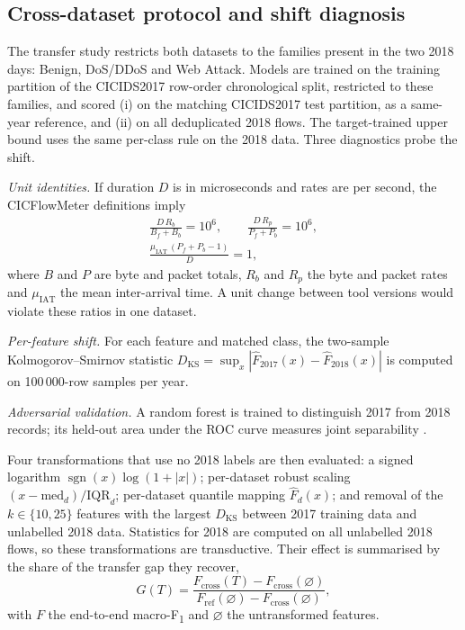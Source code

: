 \documentclass[conference]{IEEEtran}
\newcommand{\Fone}{F\textsubscript{1}}
\begin{document}
\subsection{Cross-dataset protocol and shift diagnosis}
The transfer study restricts both datasets to the families present in the two 2018 days: Benign, DoS/DDoS and Web Attack. Models are trained on the training partition of the CICIDS2017 row-order chronological split, restricted to these families, and scored (i) on the matching CICIDS2017 test partition, as a same-year reference, and (ii) on all deduplicated 2018 flows. The target-trained upper bound uses the same per-class rule on the 2018 data. Three diagnostics probe the shift.

\textit{Unit identities.} If duration $D$ is in microseconds and rates are per second, the CICFlowMeter definitions imply
\begin{equation}
\label{eq:units}
\begin{gathered}
\frac{D\,R_b}{B_f+B_b}=10^6,\qquad \frac{D\,R_p}{P_f+P_b}=10^6,\\
\frac{\mu_{\mathrm{IAT}}\,(P_f+P_b-1)}{D}=1,
\end{gathered}
\end{equation}
where $B$ and $P$ are byte and packet totals, $R_b$ and $R_p$ the byte and packet rates and $\mu_{\mathrm{IAT}}$ the mean inter-arrival time. A unit change between tool versions would violate these ratios in one dataset.

\textit{Per-feature shift.} For each feature and matched class, the two-sample Kolmogorov--Smirnov statistic $D_{\mathrm{KS}}=\sup_x|\hat F_{2017}(x)-\hat F_{2018}(x)|$ is computed on 100\,000-row samples per year.

\textit{Adversarial validation.} A random forest is trained to distinguish 2017 from 2018 records; its held-out area under the ROC curve measures joint separability \cite{quionero2009}.

Four transformations that use no 2018 labels are then evaluated: a signed logarithm $\operatorname{sgn}(x)\log(1+|x|)$; per-dataset robust scaling $(x-\mathrm{med}_d)/\mathrm{IQR}_d$; per-dataset quantile mapping $\hat F_d(x)$; and removal of the $k\in\{10,25\}$ features with the largest $D_{\mathrm{KS}}$ between 2017 training data and unlabelled 2018 data. Statistics for 2018 are computed on all unlabelled 2018 flows, so these transformations are transductive. Their effect is summarised by the share of the transfer gap they recover,
\begin{equation}
G(T)=\frac{F_{\mathrm{cross}}(T)-F_{\mathrm{cross}}(\varnothing)}{F_{\mathrm{ref}}(\varnothing)-F_{\mathrm{cross}}(\varnothing)},
\end{equation}
with $F$ the end-to-end macro-\Fone{} and $\varnothing$ the untransformed features.
\end{document}
